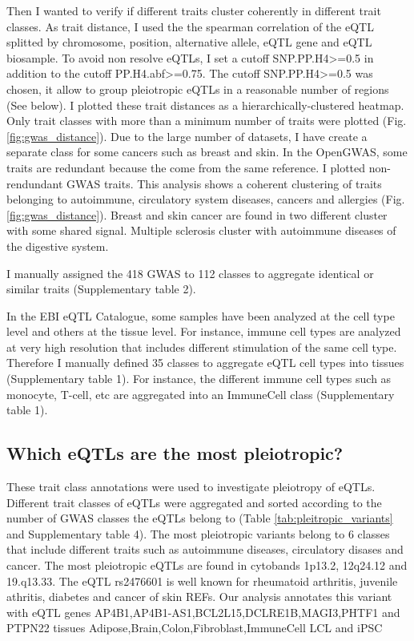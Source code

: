 Then I wanted to verify if different traits cluster coherently in different trait classes.
%
As trait distance, I used the the spearman correlation of the eQTL splitted by
chromosome, position, alternative allele, eQTL gene and eQTL biosample.
%
To avoid non resolve eQTLs, I set a cutoff SNP.PP.H4>=0.5 in addition to the cutoff PP.H4.abf>=0.75.
%
The cutoff SNP.PP.H4>=0.5 was chosen, it allow to group pleiotropic eQTLs in a reasonable number of regions (See below).
%
I plotted these trait distances as a hierarchically-clustered heatmap.
%
Only trait classes with more than a minimum number of traits were plotted (Fig. \ref{fig:gwas_distance}).
%
Due to the large number of datasets, I have create a separate class for some cancers such as breast and skin.
%
In the OpenGWAS, some traits are redundant because the come from the same reference.
%
I plotted non-rendundant GWAS traits.
%
This analysis shows a coherent clustering of traits belonging to autoimmune, circulatory system diseases, cancers and allergies (Fig. \ref{fig:gwas_distance}).
%
Breast and skin cancer are found in two different cluster with some shared signal.
%
Multiple sclerosis cluster with autoimmune diseases of the digestive system.

I manually assigned the 418 GWAS to 112 classes to aggregate identical or similar traits (Supplementary table 2).

In the EBI eQTL Catalogue, some samples have been analyzed at the cell type level and others at the tissue level.
%
For instance, immune cell types are analyzed at very high resolution that includes different stimulation of the same cell type.
%
Therefore I manually defined 35 classes to aggregate eQTL cell types into tissues (Supplementary table 1).
%
For instance, the different immune cell types such as monocyte, T-cell, etc are aggregated into an ImmuneCell class (Supplementary table 1).

%
\subsection*{Which eQTLs are the most pleiotropic?}
%

These trait class annotations were used to investigate pleiotropy of eQTLs.
%
Different trait classes of eQTLs were aggregated and sorted according to the number of GWAS classes the eQTLs belong to (Table \ref{tab:pleitropic_variants} and Supplementary table 4).
%
The most pleiotropic variants belong to 6 classes that include different traits such as autoimmune diseases, circulatory disases and cancer.
%
The most pleiotropic eQTLs are found in cytobands 1p13.2, 12q24.12 and 19.q13.33.
%
The eQTL rs2476601 is well known for rheumatoid arthritis, juvenile athritis, diabetes and cancer of skin REFs.
%
Our analysis annotates this variant with eQTL genes AP4B1,AP4B1-AS1,BCL2L15,DCLRE1B,MAGI3,PHTF1 and PTPN22 tissues Adipose,Brain,Colon,Fibroblast,ImmuneCell LCL and iPSC

